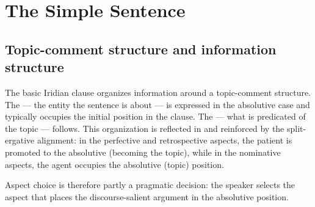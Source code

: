 \chapter{The Simple Sentence}\label{ch:simple}


\section{Topic-comment structure and information structure}\label{sec:topic-comment}


The basic Iridian clause organizes information around a topic-comment structure. The  --- the entity the sentence is about --- is expressed in the absolutive case and typically occupies the initial position in the clause. The  --- what is predicated of the topic --- follows. This organization is reflected in and reinforced by the split-ergative alignment: in the perfective and retrospective aspects, the patient is promoted to the absolutive (becoming the topic), while in the nominative aspects, the agent occupies the absolutive (topic) position.

Aspect choice is therefore partly a pragmatic decision: the speaker selects the aspect that places the discourse-salient argument in the absolutive position.

